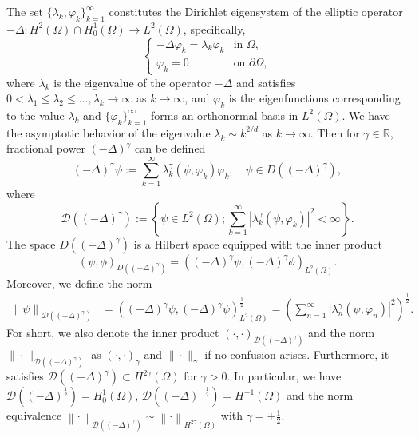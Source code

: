 \documentclass[11pt]{article}
\numberwithin{equation}{section}
\begin{document}
The set $\{\lambda_k, \varphi_k\}_{k=1}^{\infty}$ constitutes the Dirichlet eigensystem of the elliptic operator $-\Delta: H^2(\Omega) \cap H_0^1(\Omega) \to L^2(\Omega)$, specifically,
\begin{equation}\label{eigensys}
\begin{cases}
-\Delta \varphi_k = \lambda_k \varphi_k & \text{in } \Omega, \\
\varphi_k =0 & \text{on } \partial \Omega,
\end{cases}
\end{equation}
where $\lambda_k$ is the eigenvalue of the operator $-\Delta$ and satisfies $0 < \lambda_1 \leq \lambda_2 \leq \ldots , \lambda_k \rightarrow \infty$ as $k \rightarrow \infty$, and $\varphi_k$ is the eigenfunctions corresponding to the value $\lambda_k$ and $\{\varphi_k\}_{k=1}^\infty$ forms an orthonormal basis in $L^2(\Omega)$. We have the asymptotic behavior of the eigenvalue $\lambda_k\sim k^{2/d}$ as $k\to\infty$. Then for $\gamma\in\mathbb R$, fractional power $(-\Delta )^{\gamma}$ can be defined
\begin{equation*}
  (-\Delta )^{\gamma}\psi:=\sum_{k=1}^{\infty}\lambda_k^{\gamma}(\psi, \varphi _k)\varphi _k,\quad \psi \in D((-\Delta)^\gamma),
\end{equation*}
where
$$\mathcal{D}((-\Delta )^{\gamma}):=\left \{ \psi\in L^{2}(\Omega); \sum_{k=1}^{\infty}\left |\lambda_k^{\gamma}(\psi, \varphi _k ) \right |^2<\infty  \right \}.
$$
The space $D((-\Delta)^\gamma)$ is a Hilbert space equipped with the inner product
\begin{equation*}
( \psi, \phi)_{D((-\Delta)^\gamma)}  = \left ((-\Delta)^\gamma \psi, (-\Delta)^\gamma\phi \right )_{L^2(\Omega)}.
\end{equation*}
Moreover, we define the norm
$$
\begin{aligned}
\left \| \psi  \right \|_{\mathcal{D}((-\Delta )^\gamma) }
&= \left ((-\Delta)^\gamma \psi, (-\Delta)^\gamma\psi \right )_{L^2(\Omega)}^{\frac12}
= \left ( \sum_{n=1}^{\infty}\left |\lambda_n^{\gamma}(\psi, \varphi_n )  \right |^2 \right )^\frac{1}{2}.
\end{aligned}
$$
For short, we also denote the inner product $(\cdot,\cdot)_{\mathcal D((-\Delta)^\gamma)}$ and the norm $\|\cdot\|_{\mathcal D((-\Delta)^\gamma)}$ as $(\cdot,\cdot)_\gamma$ and $\|\cdot\|_\gamma$ if no confusion arises. Furthermore, it satisfies $\mathcal{D}((-\Delta )^\gamma)\subset{H^{2\gamma}(\Omega)}$ for $\gamma>0$. In particular, we have $\mathcal{D}((-\Delta )^\frac{1}{2}) = H_0^1(\Omega)$, $\mathcal{D}((-\Delta )^{-\frac{1}{2}}) = H^{-1}(\Omega)$ and the norm equivalence $\left \| \cdot   \right \| _{\mathcal{D}((-\Delta )^\gamma  ) }\sim \left \| \cdot  \right \| _{H^{2\gamma}(\Omega)}$ with $\gamma=\pm \frac12$.
\end{document}
